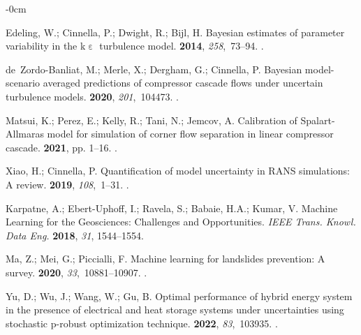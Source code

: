 \documentclass[mathematics,article,accept,pdftex,moreauthors]{Definitions/mdpi}
\begin{document}
\begin{adjustwidth}{-\extralength}{0cm}
\begin{thebibliography}{999}
Edeling, W.; Cinnella, P.; Dwight, R.; Bijl, H.
\newblock Bayesian estimates of parameter variability in the
  k{\textendash}$\upepsilon$ turbulence model.
 {\bf 2014}, {\em 258},~73--94.
.

de~Zordo-Banliat, M.; Merle, X.; Dergham, G.; Cinnella, P.
\newblock Bayesian model-scenario averaged predictions of compressor cascade
  flows under uncertain turbulence models.
 {\bf 2020}, {\em 201},~104473.
.

Matsui, K.; Perez, E.; Kelly, R.; Tani, N.; Jemcov, A.
\newblock Calibration of Spalart-Allmaras model for simulation of corner flow
  separation in linear compressor cascade.
 {\bf 2021},
  pp. 1--16.
.

Xiao, H.; Cinnella, P.
\newblock Quantification of model uncertainty in {RANS} simulations: A review.
 {\bf 2019}, {\em 108},~1--31.
.

\newpage

Karpatne, A.; Ebert{-}Uphoff, I.; Ravela, S.; Babaie, H.A.; Kumar, V.
\newblock Machine Learning for the Geosciences: Challenges and Opportunities. \emph{IEEE Trans. Knowl. Data Eng.}  \textbf{2018}, \emph{31}, 1544--1554. %

Ma, Z.; Mei, G.; Piccialli, F.
\newblock Machine learning for landslides prevention: A survey.
 {\bf 2020}, {\em
  33},~10881--10907.
.

Yu, D.; Wu, J.; Wang, W.; Gu, B.
\newblock Optimal performance of hybrid energy system in the presence of
  electrical and heat storage systems under uncertainties using stochastic
  p-robust optimization technique.
 {\bf 2022}, {\em 83},~103935.
.


\end{thebibliography}
\end{adjustwidth}
\end{document}
